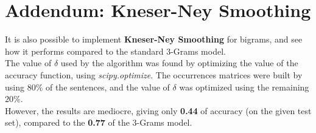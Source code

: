 \documentclass[
12pt,
a4paper,
oneside,
headinclude,
footinclude]{article}
\theoremstyle{definition} %
\begin{document}
\newpage

\section{Addendum: Kneser-Ney Smoothing}
It is also possible to implement \textbf{Kneser-Ney Smoothing} for bigrams, and see how it performs compared to the standard 3-Grams model.\\
The value of $\delta$ used by the algorithm was found by optimizing the value of the accuracy function, using \textit{scipy.optimize}.
The occurrences matrices were built by using $80\%$ of the sentences, and the value of $\delta$ was optimized using the remaining $20\%$.\\
However, the results are mediocre, giving only \textbf{0.44} of accuracy (on the given test set), compared to the \textbf{0.77} of the 3-Grams model.
\end{document}
